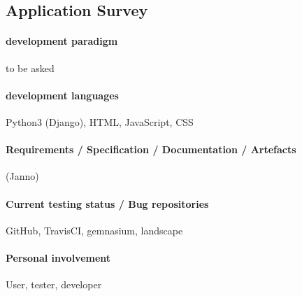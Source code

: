 \subsection{Application Survey}

\paragraph{development paradigm}

to be asked

\paragraph{development languages}

Python3 (Django), HTML, JavaScript, CSS

\paragraph{Requirements / Specification / Documentation / Artefacts}

(Janno)

\paragraph{Current testing status / Bug repositories}

GitHub, TravisCI, gemnasium, landscape

\paragraph{Personal involvement}

User, tester, developer
